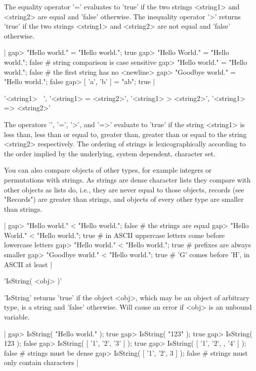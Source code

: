 The  equality  operator  '='   evaluates to  'true'   if  the two strings
<string1> and <string2> are equal and  'false' otherwise.  The inequality
operator '\<>' returns 'true' if  the two strings <string1> and <string2>
are not equal and 'false' otherwise.

|    gap> "Hello world.\n" = "Hello world.\n";
    true
    gap> "Hello World.\n" = "Hello world.\n";
    false    # string comparison is case sensitive
    gap> "Hello world." = "Hello world.\n";
    false    # the first string has no <newline>
    gap> "Goodbye world.\n" = "Hello world.\n";
    false
    gap> [ 'a', 'b' ] = "ab";
    true |

'<string1> \<\ <string2>', '<string1> \<= <string2>',
'<string1>  > <string2>', '<string1>  => <string2>'

The operators '\<', '\<=', '>', and '=>' evaluate to 'true' if the string
<string1> is less than, less than or equal to, greater than, greater than
or  equal to the string  <string2> respectively.  The ordering of strings
is  lexicographically according  to the order  implied by the underlying,
system dependent, character set.

You  can  also compare  objects  of other types, for example integers  or
permutations with strings.  As strings  are  dense  character  lists they
compare  with other objects  as lists  do, i.e., they are  never equal to
those  objects, records  (see "Records") are  greater  than  strings, and
objects of every other type are smaller than strings.

|    gap> "Hello world.\n" < "Hello world.\n";
    false    # the strings are equal
    gap> "Hello World.\n" < "Hello world.\n";
    true    # in ASCII uppercase letters come before lowercase letters
    gap> "Hello world." < "Hello world.\n";
    true    # prefixes are always smaller
    gap> "Goodbye world.\n" < "Hello world.\n";
    true    # 'G' comes before 'H', in ASCII at least |

%

'IsString( <obj> )'

'IsString' returns 'true' if the object <obj>, which  may be an object of
arbitrary type, is a  string and 'false' otherwise.   Will cause an error
if <obj> is an unbound variable.

|    gap> IsString( "Hello world.\n" );
    true
    gap> IsString( "123" );
    true
    gap> IsString( 123 );
    false
    gap> IsString( [ '1', '2', '3' ] );
    true
    gap> IsString( [ '1', '2', , '4' ] );
    false    # strings must be dense
    gap> IsString( [ '1', '2', 3 ] );
    false    # strings must only contain characters |

